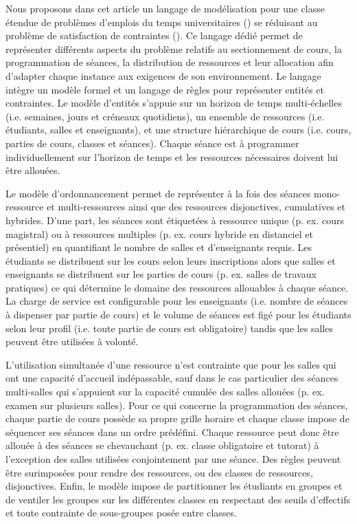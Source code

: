Nous proposons dans cet article un langage de modélisation pour une classe étendue de problèmes d'emplois du temps universitaires ({\UTP}) se réduisant au problème de satisfaction de contraintes ({\CSP}).
Ce langage dédié permet de représenter différents aspects du problème relatifs au sectionnement de cours, la programmation de séances, la distribution de ressources et leur allocation
afin d'adapter chaque instance aux exigences de son environnement.
Le langage intègre un modèle formel et un langage de règles pour représenter entités et contraintes.
Le modèle d'entités s'appuie sur un horizon de temps multi-échelles (i.e. semaines, jours et créneaux quotidiens), 
un ensemble de ressources (i.e. étudiants, salles et enseignants),
et une structure hiérarchique de cours (i.e. cours, parties de cours, classes et séances).
Chaque séance est à programmer individuellement sur l'horizon de temps et les ressources nécessaires doivent lui être allouées.

Le modèle d'ordonnancement permet de représenter à la fois des séances mono-ressource et multi-ressources ainsi que des ressources disjonctives, cumulatives et hybrides.
D'une part, les séances sont étiquetées à ressource unique (p. ex. cours magistral) ou à ressources multiples (p. ex. cours hybride en distanciel et présentiel) en quantifiant le nombre de salles et d'enseignants requis.
Les étudiants se distribuent sur les cours selon leurs inscriptions alors que salles et enseignants se distribuent sur les parties de cours (p. ex. salles de travaux pratiques) ce qui détermine %
le domaine des ressources allouables à chaque séance.
La charge de service est configurable pour les enseignants (i.e. nombre de séances à dispenser par partie de cours) et le volume de séances est figé pour les étudiants selon leur profil (i.e. toute partie de cours est obligatoire) tandis que les salles peuvent être utilisées à volonté.

L'utilisation simultanée d'une ressource n'est contrainte que pour les salles qui ont une capacité d'accueil indépassable, sauf dans le cas particulier des séances multi-salles qui s'appuient sur la capacité cumulée des salles allouées (p. ex. examen sur plusieurs salles).
Pour ce qui concerne la programmation des séances, chaque partie de cours possède sa propre grille horaire et chaque classe impose de séquencer ses séances dans un ordre prédéfini.
Chaque ressource peut donc être allouée à des séances se chevauchant (p. ex. classe obligatoire et tutorat) à l'exception des salles utilisées conjointement par une séance. 
Des règles peuvent être surimposées pour rendre des ressources, ou des classes de ressources, disjonctives.  
Enfin, le modèle impose de partitionner les étudiants en groupes et de ventiler les groupes sur les différentes classes en respectant des seuils d'effectifs et toute contrainte de sous-groupes posée entre classes.


